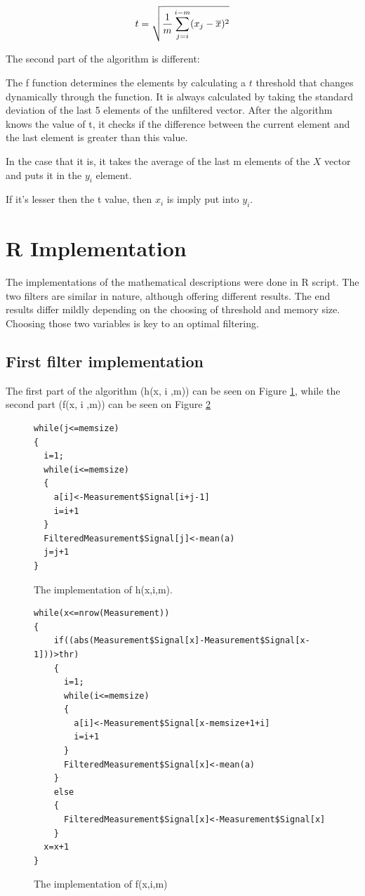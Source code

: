 \begin{equation}\fontsize{15pt}{2}
t=\sqrt{{1\over m}\sum\limits_{j=i}^{i-m}(x_j-\overline{x})^2}
\end{equation}



The second part of the algorithm is different: 

The f function determines the elements by calculating a $t$ threshold that changes dynamically through the function. It is always calculated by taking the standard deviation of the last 5 elements of the unfiltered vector. After the algorithm knows the value of t, it checks if the difference between the current element and the last element is greater than this value.

In the case that it is, it takes the average of the last m elements of the $X$ vector and puts it in the $y_i$ element.

If it's lesser then the t value, then $x_i$ is imply put into $y_i$.





\section{R Implementation} 

The implementations of the mathematical descriptions were done in R script.
The two filters are similar in nature, although offering different results.
The end results differ mildly depending on the choosing of threshold and memory size.
Choosing those two variables is key to an optimal filtering.
\subsection{First filter implementation}
The first part of the algorithm (h(x, i ,m)) can be seen on Figure \ref{fig:code1}, while the second part (f(x, i ,m)) can be seen on Figure \ref{fig:code12}
\begin{figure}[h!]
\fontsize{14}{2}
	\begin{lstlisting}
while(j<=memsize)
{
  i=1;
  while(i<=memsize)
  {
    a[i]<-Measurement$Signal[i+j-1]
    i=i+1
  }
  FilteredMeasurement$Signal[j]<-mean(a)
  j=j+1
}
	\end{lstlisting}
	\caption{The implementation of h(x,i,m).}\label{fig:code1}
\end{figure}
\begin{figure}[!h]
\fontsize{14}{2}
	\begin{lstlisting}
while(x<=nrow(Measurement))
{
    if((abs(Measurement$Signal[x]-Measurement$Signal[x-1]))>thr)
    {
      i=1;
      while(i<=memsize)
      {
        a[i]<-Measurement$Signal[x-memsize+1+i]
        i=i+1
      }
      FilteredMeasurement$Signal[x]<-mean(a)
    }
    else
    {
      FilteredMeasurement$Signal[x]<-Measurement$Signal[x]
    }
  x=x+1
}
	\end{lstlisting}
	\caption{The implementation of f(x,i,m)}\label{fig:code12}
\end{figure}


